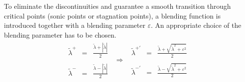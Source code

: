 \documentclass[11pt, a4paper]{article}
\begin{document}
To eliminate the discontinuities and guarantee a smooth transition through critical points (sonic points or stagnation points), a blending function is introduced together with a blending parameter $\varepsilon$. An appropriate choice of the blending parameter has to be chosen.
\begin{equation}
    \begin{matrix}
        \begin{array}{lcl}
            \tilde{\lambda}^+ & = & \displaystyle\frac{\tilde{\lambda}+\left|\tilde{\lambda}\right|}{2} \\\\
            \tilde{\lambda}^- & = & \displaystyle\frac{\tilde{\lambda}-\left|\tilde{\lambda}\right|}{2}
        \end{array} & \Rightarrow & \begin{array}{lcl}
            \tilde{\lambda}^{+'} & = & \displaystyle\frac{\tilde{\lambda}+\sqrt{\tilde{\lambda}^2+\varepsilon^2}}{2} \\\\
            \tilde{\lambda}^{-'} & = & \displaystyle\frac{\tilde{\lambda}-\sqrt{\tilde{\lambda}^2+\varepsilon^2}}{2}
        \end{array}
    \end{matrix}
\end{equation}
\end{document}
